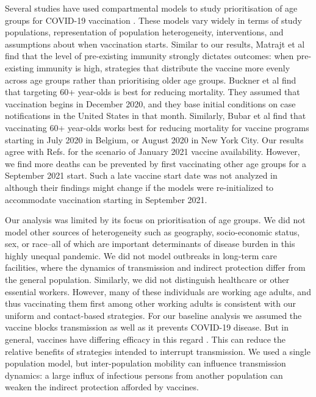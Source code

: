 Several studies have used compartmental models to study prioritisation of age groups for COVID-19 vaccination \cite{bubar2020model,hoyt2020vaccine,matrajt2020vaccine}. These models vary widely in terms of study populations, representation of population heterogeneity, interventions, and assumptions about when vaccination starts. Similar to our results, Matrajt et al \cite{matrajt2020vaccine}  find that the level of pre-existing immunity strongly dictates outcomes: when pre-existing immunity is high, strategies that distribute the vaccine more evenly across age groups rather than prioritising older age groups. Buckner et al \cite{hoyt2020vaccine} find that targeting 60+ year-olds is best for reducing mortality. They assumed that vaccination begins in December 2020, and they base initial conditions on case notifications in the United States in that month. Similarly, Bubar et al \cite{bubar2020model} find that vaccinating 60+ year-olds works best for reducing mortality for vaccine programs starting in July 2020 in Belgium, or August 2020 in New York City. Our results agree with Refs. \cite{bubar2020model,hoyt2020vaccine} for the scenario of January 2021 vaccine availability. However, we find more deaths can be prevented by first vaccinating other age groups for a September 2021 start. Such a late vaccine start date was not analyzed in \cite{bubar2020model,hoyt2020vaccine} although their findings might change if the models were re-initialized to accommodate vaccination starting in September 2021. 

Our analysis was limited by its focus on prioritisation of age groups. We did not model other sources of heterogeneity such as geography, socio-economic status, sex, or race--all of which are important determinants of disease burden in this highly unequal pandemic. We did not model outbreaks in long-term care facilities, where the dynamics of transmission and indirect protection differ from the general population. Similarly, we did not distinguish healthcare or other essential workers. However, many of these individuals are working age adults, and thus vaccinating them first among other working adults is consistent with our uniform and contact-based strategies.  For our baseline analysis we assumed the vaccine blocks transmission as well as it prevents COVID-19 disease. But in general, vaccines have differing efficacy in this regard \cite{hodgson2020defines}. This can reduce the relative benefits of strategies intended to interrupt transmission.  We used a single population model, but inter-population mobility can influence transmission dynamics: a large influx of infectious persons from another population can weaken the indirect protection afforded by vaccines. 


